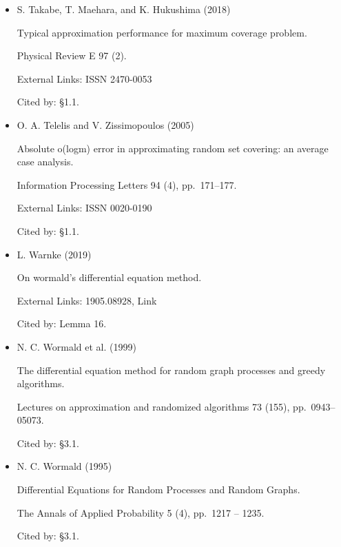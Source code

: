 \begin{itemize}
Smoothed analysis of algorithms: why the simplex algorithm usually takes polynomial time.

Journal of the ACM (JACM) 51 (3), pp. 385–463.

Cited by: §1.



\item[] [28]
S. Takabe, T. Maehara, and K. Hukushima (2018)

Typical approximation performance for maximum coverage problem.

Physical Review E 97 (2).

External Links: ISSN 2470-0053

Cited by: §1.1.



\item[] [29]
O. A. Telelis and V. Zissimopoulos (2005)

Absolute o(logm) error in approximating random set covering: an average case analysis.

Information Processing Letters 94 (4), pp. 171–177.

External Links: ISSN 0020-0190

Cited by: §1.1.



\item[] [30]
L. Warnke (2019)

On wormald’s differential equation method.

External Links: 1905.08928,
Link

Cited by: Lemma 16.



\item[] [31]
N. C. Wormald et al. (1999)

The differential equation method for random graph processes and greedy algorithms.

Lectures on approximation and randomized algorithms 73 (155), pp. 0943–05073.

Cited by: §3.1.



\item[] [32]
N. C. Wormald (1995)

Differential Equations for Random Processes and Random Graphs.

The Annals of Applied Probability 5 (4), pp. 1217 – 1235.

Cited by: §3.1.



\end{itemize}




